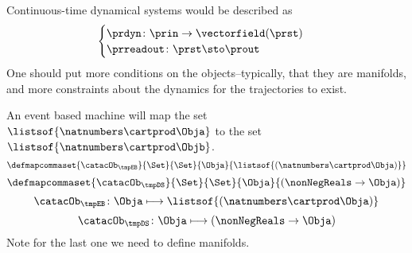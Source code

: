 Continuous-time dynamical systems would be described as
%
\begin{equation}
    \label{eq:continuous}
    \begin{cases}
        \prdyn\colon \prin \to \vectorfield(\prst) \\
        \prreadout\colon \prst \sto   \prout
    \end{cases}
\end{equation}
%
One should put more conditions on the objects--typically, that they are manifolds, and more constraints about the dynamics for the trajectories to exist.

An event based machine will map the set~$\listsof{\natnumbers \cartprod \Obja}$ to the set~$\listsof{\natnumbers \cartprod \Objb}$.
%
\begin{equation}
    \defmapcommaset{
        \catacOb_{\tmpEB}
    }{
        \Set
    }{
        \Set
    }{
        \Obja
    }{
        \listsof{(\natnumbers \cartprod \Obja)}
    }
\end{equation}
%
\begin{equation}
    \defmapcommaset{
        \catacOb_{\tmpDS}
    }{
        \Set
    }{
        \Set
    }{
        \Obja
    }{
        (\nonNegReals \to \Obja)
    }
\end{equation}
%
\begin{equation}
    \label{eq:phi-EB}
    {\catacOb_{\tmpEB}}\colon{\Obja}\longmapsto{\listsof{(\natnumbers \cartprod \Obja)}}
\end{equation}
%
\begin{equation}
    \label{eq:phi-DS}
    {\catacOb_{\tmpDS}}\colon{\Obja}\longmapsto{(\nonNegReals \to \Obja)}
\end{equation}
%
Note for the last one we need to define manifolds.
